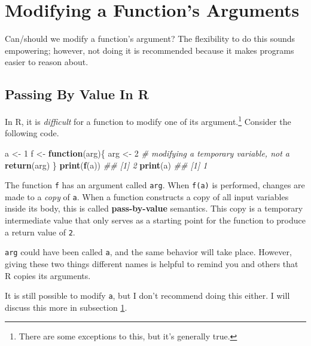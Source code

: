\documentclass[12pt,krantz2]{krantz}
\makeatletter
\newenvironment{Shaded}{\begin{snugshade}}{\end{snugshade}}
\newcommand{\CommentTok}[1]{\textcolor[rgb]{0.37,0.37,0.37}{\textit{#1}}}
\newcommand{\ControlFlowTok}[1]{\textcolor[rgb]{0.27,0.27,0.27}{\textbf{#1}}}
\newcommand{\DecValTok}[1]{\textcolor[rgb]{0.06,0.06,0.06}{#1}}
\newcommand{\KeywordTok}[1]{\textcolor[rgb]{0.27,0.27,0.27}{\textbf{#1}}}
\newcommand{\NormalTok}[1]{#1}
\newcommand{\StringTok}[1]{\textcolor[rgb]{0.5,0.5,0.5}{#1}}
\newenvironment{kframe}{%
\medskip{}
\setlength{\fboxsep}{.8em}
 \def\at@end@of@kframe{}%
 \ifinner\ifhmode%
  \def\at@end@of@kframe{\end{minipage}}%
  \begin{minipage}{\columnwidth}%
 \fi\fi%
 \def\FrameCommand##1{\hskip\@totalleftmargin \hskip-\fboxsep
 \colorbox{shadecolor}{##1}\hskip-\fboxsep
     \hskip-\linewidth \hskip-\@totalleftmargin \hskip\columnwidth}%
 \MakeFramed {\advance\hsize-\width
   \@totalleftmargin\z@ \linewidth\hsize
   \@setminipage}}%
 {\par\unskip\endMakeFramed%
 \at@end@of@kframe}
\renewenvironment{Shaded}{\begin{kframe}}{\end{kframe}}
\makeatother
\begin{document}
\hypertarget{modifying-a-functions-arguments}{%
\section{Modifying a Function's Arguments}\label{modifying-a-functions-arguments}}

Can/should we modify a function's argument? The flexibility to do this sounds empowering; however, not doing it is recommended because it makes programs easier to reason about.

\hypertarget{passing-by-value-in-r}{%
\subsection{Passing By Value In R}\label{passing-by-value-in-r}}

In R, it is \emph{difficult} for a function to modify one of its argument.\footnote{There are some exceptions to this, but it's generally true.} Consider the following code.

\begin{Shaded}
\begin{Highlighting}[]
\NormalTok{a <-}\StringTok{ }\DecValTok{1}
\NormalTok{f <-}\StringTok{ }\ControlFlowTok{function}\NormalTok{(arg)\{}
\NormalTok{  arg <-}\StringTok{ }\DecValTok{2} \CommentTok{# modifying a temporary variable, not a}
  \KeywordTok{return}\NormalTok{(arg)}
\NormalTok{\}}
\KeywordTok{print}\NormalTok{(}\KeywordTok{f}\NormalTok{(a))}
\CommentTok{## [1] 2}
\KeywordTok{print}\NormalTok{(a)}
\CommentTok{## [1] 1}
\end{Highlighting}
\end{Shaded}

The function \texttt{f} has an argument called \texttt{arg}. When \texttt{f(a)} is performed, changes are made to a \emph{copy} of \texttt{a}. When a function constructs a copy of all input variables inside its body, this is called \textbf{pass-by-value} semantics. This copy is a temporary intermediate value that only serves as a starting point for the function to produce a return value of \texttt{2}.

\texttt{arg} could have been called \texttt{a}, and the same behavior will take place. However, giving these two things different names is helpful to remind you and others that R copies its arguments.

It is still possible to modify \texttt{a}, but I don't recommend doing this either. I will discuss this more in subsection \ref{modifying-a-functions-arguments}.
\end{document}
